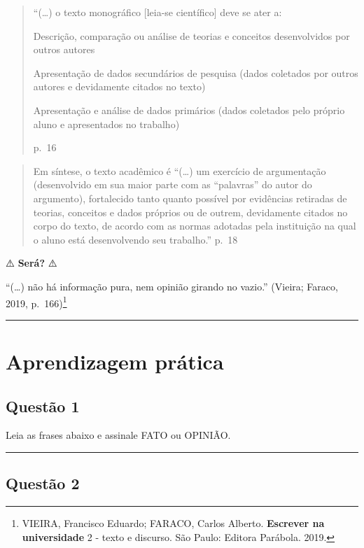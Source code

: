 \documentclass[
]{book}
\begin{document}
\begin{quote}
``(\ldots) o texto monográfico {[}leia-se científico{]} deve se ater a:

Descrição, comparação ou análise de teorias e conceitos desenvolvidos por outros autores

Apresentação de dados secundários de pesquisa (dados coletados por outros autores e devidamente citados no texto)

Apresentação e análise de dados primários (dados coletados pelo próprio aluno e apresentados no trabalho)

p.~16
\end{quote}

\begin{quote}
Em síntese, o texto acadêmico é ``(\ldots) um exercício de argumentação (desenvolvido em sua maior parte com as ``palavras'' do autor do argumento), fortalecido tanto quanto possível por evidências retiradas de teorias, conceitos e dados próprios ou de outrem, devidamente citados no corpo do texto, de acordo com as normas adotadas pela instituição na qual o aluno está desenvolvendo seu trabalho.'' p.~18
\end{quote}

⚠️ \textbf{Será?} ⚠️

``(\ldots) não há informação pura, nem opinião girando no vazio.'' (Vieira; Faraco, 2019, p.~166)\footnote{VIEIRA, Francisco Eduardo; FARACO, Carlos Alberto. \textbf{Escrever na universidade} 2 - texto e discurso. São Paulo: Editora Parábola. 2019.}

\begin{center}\rule{0.5\linewidth}{0.5pt}\end{center}

\section{Aprendizagem prática}\label{aprendizagem-pruxe1tica-2}

\subsection{Questão 1}\label{questuxe3o-1-2}

Leia as frases abaixo e assinale FATO ou OPINIÃO.

\begin{center}\rule{0.5\linewidth}{0.5pt}\end{center}

\subsection{Questão 2}\label{questuxe3o-2-1}
\end{document}
